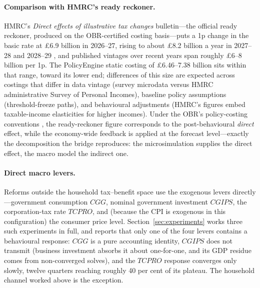 \paragraph{Comparison with HMRC's ready reckoner.} HMRC's \emph{Direct effects of illustrative tax changes} bulletin---the official ready reckoner, produced on the OBR-certified costing basis---puts a 1p change in the basic rate at \pounds 6.9 billion in 2026--27, rising to about \pounds 8.2 billion a year in 2027--28 and 2028--29 \citep{hmrc2025reckoner}, and published vintages over recent years span roughly \pounds 6--8 billion per 1p. The PolicyEngine static costing of \pounds 6.46--7.38 billion sits within that range, toward its lower end; differences of this size are expected across costings that differ in data vintage (survey microdata versus HMRC administrative Survey of Personal Incomes), baseline policy assumptions (threshold-freeze paths), and behavioural adjustments (HMRC's figures embed taxable-income elasticities for higher incomes). Under the OBR's policy-costing conventions \citep{obr2014costings}, the ready-reckoner figure corresponds to the post-behavioural \emph{direct} effect, while the economy-wide feedback is applied at the forecast level---exactly the decomposition the bridge reproduces: the microsimulation supplies the direct effect, the macro model the indirect one.

\paragraph{Direct macro levers.} Reforms outside the household tax--benefit space use the exogenous levers directly---government consumption $CGG$, nominal government investment $CGIPS$, the corporation-tax rate $TCPRO$, and (because the CPI is exogenous in this configuration) the consumer price level. Section~\ref{sec:experiments} works three such experiments in full, and reports that only one of the four levers contains a behavioural response: $CGG$ is a pure accounting identity, $CGIPS$ does not transmit (business investment absorbs it about one-for-one, and its GDP residue comes from non-converged solves), and the $TCPRO$ response converges only slowly, twelve quarters reaching roughly 40 per cent of its plateau. The household channel worked above is the exception.
